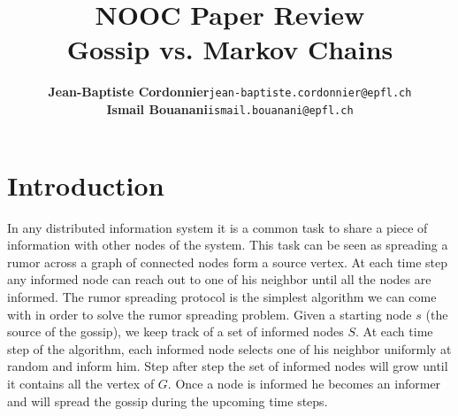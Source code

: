 \documentclass[10pt,journal,a4paper]{IEEEtran}
\begin{document}
%
\title{NOOC Paper Review\\Gossip vs. Markov Chains}
\author{\begin{tabular}{rl}
\textbf{Jean-Baptiste Cordonnier}&\texttt{jean-baptiste.cordonnier@epfl.ch}\\\textbf{Ismail Bouanani}&\texttt{ismail.bouanani@epfl.ch}
\end{tabular}}


\newcommand{\norm}[1]{\left\lVert#1\right\rVert}
\newtheorem{theorem}{Theorem}
\newtheorem{definition}{Definition}
\renewcommand{\l}{\left}
\renewcommand{\r}{\right}
\renewcommand{\P}[1]{\mathbf{P}\l\{#1\r\}}
\newcommand{\E}[1]{\mathbf{E}\l[#1\r]}

\maketitle
\IEEEdisplaynotcompsoctitleabstractindextext

\section{Introduction}

In any distributed information system it is a common task to share a piece of information with other nodes of the system. This task can be seen as spreading a rumor across a graph of connected nodes form a source vertex. At each time step any informed node can reach out to one of his neighbor until all the nodes are informed. The rumor spreading protocol is the simplest algorithm we can come with in order to solve the rumor spreading problem. Given a starting node $s$ (the source of the gossip), we keep track of a set of informed nodes $S$. At each time step of the algorithm, each informed node selects one of his neighbor uniformly at random and inform him. Step after step the set of informed nodes will grow until it contains all the vertex of $G$. Once a node is informed he becomes an informer and will spread the gossip during the upcoming time steps.
\end{document}
